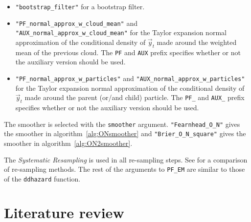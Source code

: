 \begin{itemize}
	\item \verb|"bootstrap_filter"| for a bootstrap filter.
	\item \verb|"PF_normal_approx_w_cloud_mean"| and \verb|"AUX_normal_approx_w_cloud_mean"| for the Taylor expansion normal approximation of the conditional density of $\vec{y}_t$ made around the weighted mean of the previous cloud. The \verb|PF| and \verb|AUX| prefix specifies whether or not the auxiliary version should be used.
	\item \verb|"PF_normal_approx_w_particles"| and \verb|"AUX_normal_approx_w_particles"| for the Taylor expansion normal approximation of the conditional density of $\vec{y}_t$ made around the parent (or/and child) particle. The \verb|PF_| and \verb|AUX_| prefix specifies whether or not the auxiliary version should be used.
\end{itemize}

The smoother is selected with the \verb|smoother| argument. \verb|"Fearnhead_O_N"| gives the smoother in algorithm~\ref{alg:ONsmoother} and \verb|"Brier_O_N_square"| gives the smoother in algorithm~\ref{alg:ON2smoother}.

The \emph{Systematic Resampling} \citep{kitagawa96} is used in all re-sampling steps. See \cite{douc05} for a comparison of re-sampling methods. The rest of the arguments to \verb|PF_EM| are similar to those of the \verb|ddhazard| function.





\iffalse
\section{Literature review}
